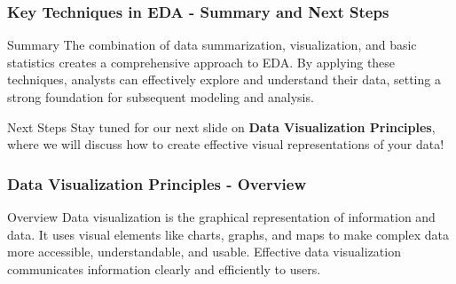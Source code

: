 \documentclass[aspectratio=169]{beamer}
\begin{document}
\begin{frame}[fragile]
    \frametitle{Key Techniques in EDA - Summary and Next Steps}
    \begin{block}{Summary}
        The combination of data summarization, visualization, and basic statistics creates a comprehensive approach to EDA. By applying these techniques, analysts can effectively explore and understand their data, setting a strong foundation for subsequent modeling and analysis.
    \end{block}
    \begin{block}{Next Steps}
        Stay tuned for our next slide on \textbf{Data Visualization Principles}, where we will discuss how to create effective visual representations of your data!
    \end{block}
\end{frame}

\begin{frame}[fragile]
    \frametitle{Data Visualization Principles - Overview}
    \begin{block}{Overview}
        Data visualization is the graphical representation of information and data. 
        It uses visual elements like charts, graphs, and maps to make complex data more accessible, understandable, and usable. 
        Effective data visualization communicates information clearly and efficiently to users.
    \end{block}
\end{frame}
\end{document}
